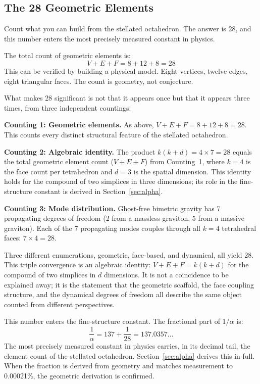 \documentclass[aps,prd,preprint,superscriptaddress,showpacs,preprintnumbers,amsmath,amssymb,nofootinbib]{revtex4-2}
\begin{document}
\subsection{The 28 Geometric Elements}
\label{subsec:elements}

Count what you can build from the stellated octahedron. The answer is 28, and this number enters the most precisely measured constant in physics.

The total count of geometric elements is:
\begin{equation}
V + E + F = 8 + 12 + 8 = 28
\label{eq:28-elements}
\end{equation}
This can be verified by building a physical model. Eight vertices, twelve edges, eight triangular faces. The count is geometry, not conjecture.

What makes 28 significant is not that it appears once but that it appears three times, from three independent countings:

\textbf{Counting 1: Geometric elements.} As above, $V + E + F = 8 + 12 + 8 = 28$. This counts every distinct structural feature of the stellated octahedron.

\textbf{Counting 2: Algebraic identity.} The product $k(k+d) = 4 \times 7 = 28$ equals the total geometric element count ($V + E + F$) from Counting~1, where $k = 4$ is the face count per tetrahedron and $d = 3$ is the spatial dimension. This identity holds for the compound of two simplices in three dimensions; its role in the fine-structure constant is derived in Section~\ref{sec:alpha}.

\textbf{Counting 3: Mode distribution.} Ghost-free bimetric gravity has 7 propagating degrees of freedom (2 from a massless graviton, 5 from a massive graviton). Each of the 7 propagating modes couples through all $k = 4$ tetrahedral faces: $7 \times 4 = 28$.

Three different enumerations, geometric, face-based, and dynamical, all yield 28. This triple convergence is an algebraic identity: $V + E + F = k(k + d)$ for the compound of two simplices in $d$ dimensions. It is not a coincidence to be explained away; it is the statement that the geometric scaffold, the face coupling structure, and the dynamical degrees of freedom all describe the same object counted from different perspectives.

This number enters the fine-structure constant. The fractional part of $1/\alpha$ is:
\begin{equation}
\frac{1}{\alpha} = 137 + \frac{1}{28} = 137.0357\ldots
\label{eq:alpha-preview}
\end{equation}
The most precisely measured constant in physics carries, in its decimal tail, the element count of the stellated octahedron. Section~\ref{sec:alpha} derives this in full. When the fraction is derived from geometry and matches measurement to 0.00021\%, the geometric derivation is confirmed.
\end{document}
